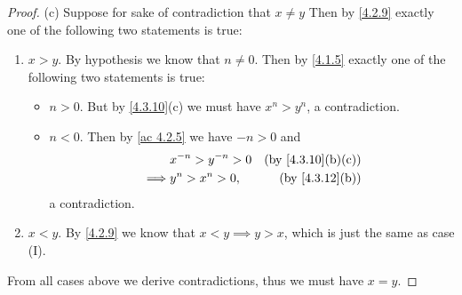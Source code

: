 \begin{proof}{(c)}
  Suppose for sake of contradiction that \(x \neq y\)
  Then by \cref{4.2.9} exactly one of the following two statements is true:
  \begin{enumerate}[label=(\Roman*)]
    \item \(x > y\).
          By hypothesis we know that \(n \neq 0\).
          Then by \cref{4.1.5} exactly one of the following two statements is true:
          \begin{itemize}
            \item \(n > 0\).
                  But by \cref{4.3.10}(c) we must have \(x^n > y^n\), a contradiction.
            \item \(n < 0\).
                  Then by \cref{ac 4.2.5} we have \(-n > 0\) and
                  \begin{align*}
                             & x^{-n} > y^{-n} > 0 & \text{(by \cref{4.3.10}(b)(c))} \\
                    \implies & y^n > x^n > 0,      & \text{(by \cref{4.3.12}(b))}
                  \end{align*}
                  a contradiction.
          \end{itemize}
    \item \(x < y\).
          By \cref{4.2.9} we know that \(x < y \implies y > x\), which is just the same as case (I).
  \end{enumerate}
  From all cases above we derive contradictions, thus we must have \(x = y\).
\end{proof}


